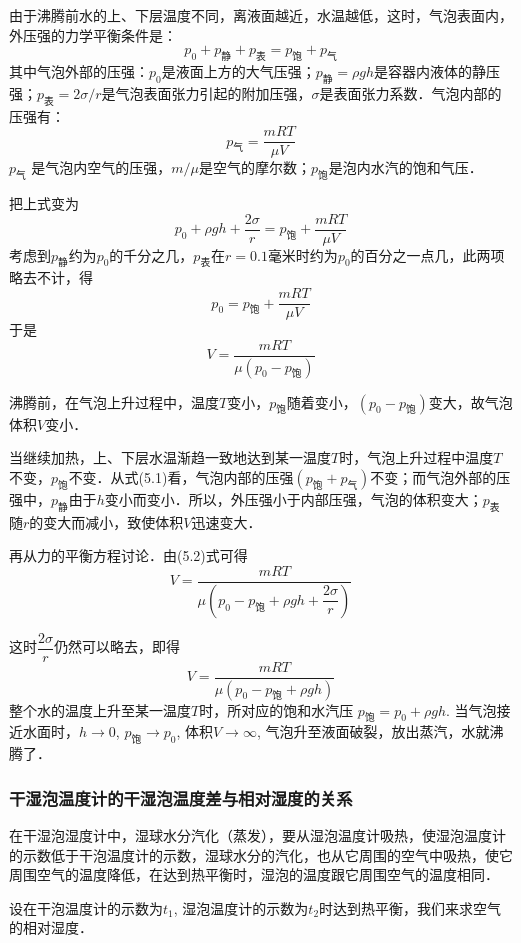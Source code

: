 由于沸腾前水的上、下层温度不同，离液面越近，水温越低，这时，气泡表面内，外压强的力学平衡条件是：
\begin{equation}
  p_0+p_{\text{静}}+p_{\text{表}}=p_{\text{饱}}+p_{\text{气}}
\end{equation}
其中气泡外部的压强：$p_0$是液面上方的大气压强；$p_{\text{静}}=\rho gh$是容器内液体的静压强；$p_{\text{表}}=2\sigma/r$是气泡表面张力引起的附加压强，$\sigma$是表面张力系数．气泡内部的压强有：
\[p_{\text{气}}=\frac{mRT}{\mu V}\]
$p_{\text{气}}$
是气泡内空气的压强，$m/\mu$是空气的摩尔数；$p_{\text{饱}}$是泡内水汽的饱和气压．

把上式变为
\begin{equation}
  p_0+\rho gh+\frac{2\sigma}{r}=p_{\text{饱}}+\frac{mRT}{\mu V}
\end{equation}
考虑到$p_{\text{静}}$约为$p_0$的千分之几，$p_{\text{表}}$在$r=0. 1$毫米时约为$p_0$的百分之一点几，此两项略去不计，得
\[p_0=p_{\text{饱}}+\frac{mRT}{\mu V}\]
于是
\[V=\frac{mRT}{\mu (p_0-p_{\text{饱}})}\]

沸腾前，在气泡上升过程中，温度$T$变小，$p_{\text{饱}}$随着变小，$(p_0-p_{\text{饱}})$变大，故气泡体积$V$变小．

当继续加热，上、下层水温渐趋一致地达到某一温度$T$时，气泡上升过程中温度$T$不变，$p_{\text{饱}}$不变．从式(5.1)看，气泡内部的压强$(p_{\text{饱}}+p_{\text{气}})$不变；而气泡外部的压强中，$p_{\text{静}}$由于$h$变小而变小．所以，外压强小于内部压强，气泡的体积变大；$p_{\text{表}}$随$r$的变大而减小，致使体积$V$迅速变大．

再从力的平衡方程讨论．由(5.2)式可得
\[V=\frac{mRT}{\mu\left(p_0-p_{\text{饱}}+\rho gh+\dfrac{2\sigma}{r}\right)}\]

这时$\dfrac{2\sigma}{r}$仍然可以略去，即得
\[V=\frac{mRT}{\mu(p_0-p_{\text{饱}}+\rho gh)}\]
整个水的温度上升至某一温度$T$时，所对应的饱和水汽压
$p_{\text{饱}}=p_0+\rho gh$. 当气泡接近水面时，$h\to 0$, $p_{\text{饱}}\to p_0$, 体积$V\to \infty$, 气泡升至液面破裂，放出蒸汽，水就沸腾了．

\subsubsection{干湿泡温度计的干湿泡温度差与相对湿度的关系}

在干湿泡湿度计中，湿球水分汽化（蒸发），要从湿泡温度计吸热，使湿泡温度计的示数低于干泡温度计的示数，湿球水分的汽化，也从它周围的空气中吸热，使它周围空气的温度降低，在达到热平衡时，湿泡的温度跟它周围空气的温度相同．

设在干泡温度计的示数为$t_1$, 湿泡温度计的示数为$t_2$时达到热平衡，我们来求空气的相对湿度．


